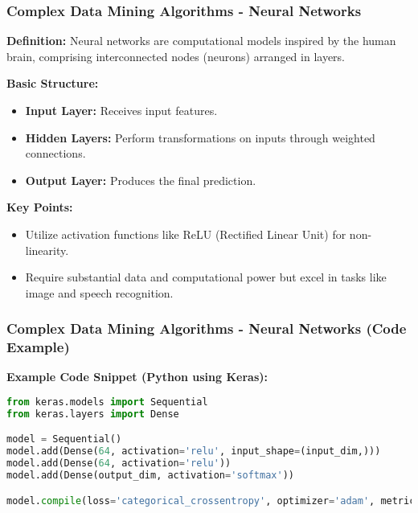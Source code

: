 \documentclass{beamer}
\begin{document}
\begin{frame}[fragile]
    \frametitle{Complex Data Mining Algorithms - Neural Networks}
    \textbf{Definition:} Neural networks are computational models inspired by the human brain, comprising interconnected nodes (neurons) arranged in layers.

    \textbf{Basic Structure:}
    \begin{itemize}
        \item \textbf{Input Layer:} Receives input features.
        \item \textbf{Hidden Layers:} Perform transformations on inputs through weighted connections.
        \item \textbf{Output Layer:} Produces the final prediction.
    \end{itemize}

    \textbf{Key Points:}
    \begin{itemize}
        \item Utilize activation functions like ReLU (Rectified Linear Unit) for non-linearity.
        \item Require substantial data and computational power but excel in tasks like image and speech recognition.
    \end{itemize}
\end{frame}

\begin{frame}[fragile]
    \frametitle{Complex Data Mining Algorithms - Neural Networks (Code Example)}
    \textbf{Example Code Snippet (Python using Keras):}
    \begin{lstlisting}[language=Python]
from keras.models import Sequential
from keras.layers import Dense

model = Sequential()
model.add(Dense(64, activation='relu', input_shape=(input_dim,)))
model.add(Dense(64, activation='relu'))
model.add(Dense(output_dim, activation='softmax'))

model.compile(loss='categorical_crossentropy', optimizer='adam', metrics=['accuracy'])
    \end{lstlisting}
\end{frame}
\end{document}
